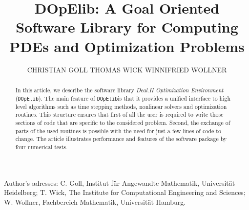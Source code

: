 \documentclass[prodmode,acmtoms]{acmsmall}
\numberwithin{equation}{section}
\newcommand{\dope}{\texttt{DOpElib}}
\begin{document}

\title{DOpElib: A Goal Oriented Software Library for Computing PDEs and Optimization Problems}

\author{CHRISTIAN GOLL
THOMAS WICK
WINNIFRIED WOLLNER
}


\begin{abstract}
In this article, we describe the software library 
\textit{Deal.II Optimization Environment} (\dope).
The main feature of \dope is that it provides a unified interface to high level algorithms 
such as time stepping methods, nonlinear solvers and optimization routines. This structure ensures 
that first of all the user is required to write those sections of code that are specific to 
the considered problem. Second, the exchange of parts of the used routines is possible 
with the need for just a few lines of code to change.
The article illustrates performance and features 
of the software package by four numerical tests. 
\end{abstract}





\begin{bottomstuff}
Author's adresses: C. Goll, Institut f\"ur Angewandte Mathematik,
Universit\"at Heidelberg;
T. Wick, The Institute for Computational Engineering and Sciences;
W. Wollner, Fachbereich Mathematik, Universit\"at Hamburg.
\end{bottomstuff}
                      

\maketitle


\end{document}

